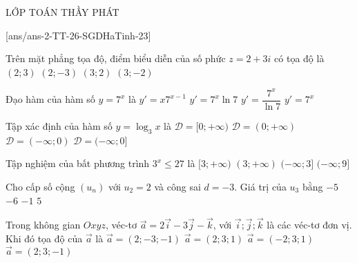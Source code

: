 \begin{name}
	{\tenchude}{\tendethi}{LỚP TOÁN THẦY PHÁT}{\thoigian}
\end{name}
\setcounter{ex}{0}
[ans/ans-2-TT-26-SGDHaTinh-23]

\begin{ex}%
	Trên mặt phẳng tọa độ, điểm biểu diễn của số phức $z=2+3i$ có tọa độ là
	\choice
	{\True $(2;3)$}
	{$(2;-3)$}
	{$(3;2)$}
	{$(3;-2)$}
\end{ex}

\begin{ex}%
	Đạo hàm của hàm số $y=7^x$ là
	\choice
	{$y'=x7^{x-1}$}
	{\True $y'=7^x\ln 7$}
	{$y'=\dfrac{7^x}{\ln 7}$}
	{$y'=7^x$}
\end{ex}

\begin{ex}%
	Tập xác định của hàm số $y=\log_3x$ là
	\choice
	{$\mathscr{D}=[0;+\infty)$}
	{\True $\mathscr{D}=(0;+\infty)$}
	{$\mathscr{D}=(-\infty;0)$}
	{$\mathscr{D}=(-\infty;0]$}
\end{ex}

\begin{ex}%
	Tập nghiệm của bất phương trình $3^x \leq 27$ là
	\choice
	{$[3;+\infty)$}
	{$(3;+\infty)$}
	{\True $(-\infty;3]$}
	{$(-\infty;9]$}
\end{ex}

\begin{ex}%
	Cho cấp số cộng $(u_n)$ với $u_2=2$ và công sai $d=-3$. Giá trị của $u_3$ bằng
	\choice
	{$-5$}
	{$-6$}
	{\True $-1$}
	{$5$}
\end{ex}

\begin{ex}%
	Trong không gian $Oxyz$, véc-tơ $\overrightarrow{a}=2\overrightarrow{i}-3\overrightarrow{j}-\overrightarrow{k}$, với $\overrightarrow{i};\overrightarrow{j};\overrightarrow{k}$ là các véc-tơ đơn vị. Khi đó tọa độ của $\overrightarrow{a}$ là
	\choice
	{\True $\overrightarrow{a}=(2;-3;-1)$}
	{$\overrightarrow{a}=(2;3;1)$}
	{$\overrightarrow{a}=(-2;3;1)$}
	{$\overrightarrow{a}=(2;3;-1)$}
\end{ex}

